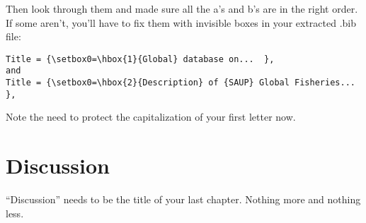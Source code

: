 \documentclass[12pt]{article}
\begin{document}
Then look through them and made sure all the a's and b's are in the right order. If some aren't, you'll have to fix them with invisible boxes in your extracted .bib file:
\begin{verbatim}
Title = {\setbox0=\hbox{1}{Global} database on...  },
and
Title = {\setbox0=\hbox{2}{Description} of {SAUP} Global Fisheries... },
\end{verbatim}

Note the need to protect the capitalization of your first letter now.

\section{Discussion}
``Discussion'' needs to be the title of your last chapter. Nothing more and nothing less.
\end{document}
